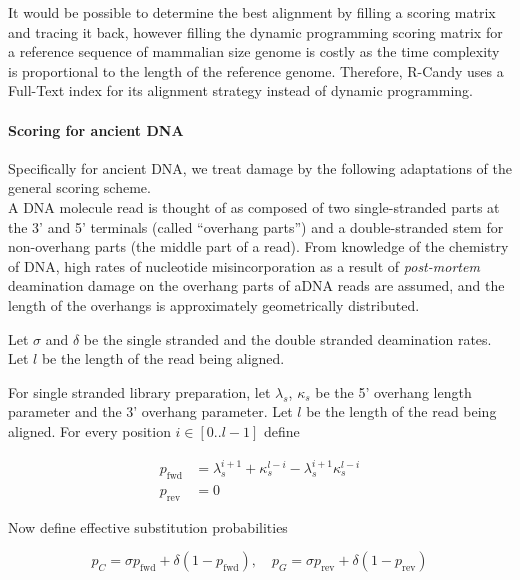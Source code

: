 \documentclass[11pt,a4paper]{report}
\begin{document}
It would be possible to determine the best alignment by filling a 
scoring matrix and tracing it back, however filling the dynamic 
programming scoring matrix for a reference sequence of mammalian 
size genome is costly as the time complexity is proportional to 
the length of the reference genome. Therefore, R-Candy uses a 
Full-Text index for its alignment strategy instead of dynamic 
programming. 



\paragraph{Scoring for ancient DNA} \label{Scoring}


Specifically for ancient DNA, we treat damage by the following
adaptations of the general scoring scheme.\\
A DNA molecule read is thought of as composed of two single-stranded parts at 
the 3' and 5' terminals (called ``overhang parts'') and a 
double-stranded stem for non-overhang parts (the middle part of
a read). From knowledge of the chemistry of DNA\cite{DNAchemistry}, high rates of 
nucleotide misincorporation as a result of \emph{post-mortem} 
deamination damage on the overhang parts of aDNA reads are assumed, and
the length of the overhangs is approximately 
geometrically distributed\cite{mapdamage2}. 

Let $\sigma$ and $\delta$ be the single stranded and the double stranded
deamination rates.  Let $l$ be the length of the read being aligned.  

For single stranded library preparation, let $\lambda_s$, $\kappa_s$ be
the 5' overhang length parameter and the 3' overhang parameter.  Let $l$
be the length of the read being aligned.  For every position $i \in
[0..l-1]$ define

\begin{align*}
p_{\mbox{fwd}} &= \lambda_s^{i+1} + \kappa_s^{l-i} - \lambda_s^{i+1} \kappa_s^{l-i} \\
p_{\mbox{rev}} &= 0
\end{align*}

Now define effective substitution probabilities

\begin{equation*}
p_{C} = \sigma p_{\mbox{fwd}} + \delta (1 - p_{\mbox{fwd}}), \quad
p_{G} = \sigma p_{\mbox{rev}} + \delta (1 - p_{\mbox{rev}}) 
\end{equation*}
\end{document}
